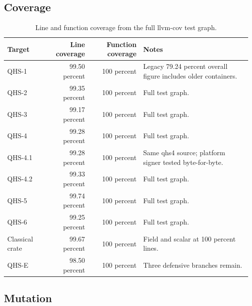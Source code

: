 \documentclass[11pt,a4paper]{article}
\begin{document}
\clearpage
\subsection{Coverage}

\begin{table}[ht]
\centering
\caption{Line and function coverage from the full llvm-cov test graph.}
\label{tab:coverage}
\small
\begin{tabularx}{\textwidth}{@{}l r r Y@{}}
\toprule
Target & Line coverage & Function coverage & Notes\\
\midrule
QHS-1 & 99.50 percent & 100 percent & Legacy 79.24 percent overall figure includes older containers.\\
QHS-2 & 99.35 percent & 100 percent & Full test graph.\\
QHS-3 & 99.17 percent & 100 percent & Full test graph.\\
QHS-4 & 99.28 percent & 100 percent & Full test graph.\\
QHS-4.1 & 99.28 percent & 100 percent & Same qhs4 source; platform signer tested byte-for-byte.\\
QHS-4.2 & 99.33 percent & 100 percent & Full test graph.\\
QHS-5 & 99.74 percent & 100 percent & Full test graph.\\
QHS-6 & 99.25 percent & 100 percent & Full test graph.\\
Classical crate & 99.67 percent & 100 percent & Field and scalar at 100 percent lines.\\
QHS-E & 98.50 percent & 100 percent & Three defensive branches remain.\\
\bottomrule
\end{tabularx}
\end{table}
\FloatBarrier

\clearpage
\subsection{Mutation}
\end{document}
